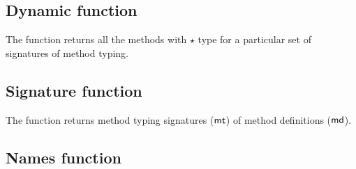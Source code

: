 \documentclass{tex/llncs}
\begin{document}
\begin{mathpar}




\end{mathpar}

\subsection{Dynamic function}

The  function returns all the methods with $\star$ type for a particular set of 
signatures of method typing.

\begin{mathpar}

\end{mathpar}

\subsection{Signature function}

The  function returns method typing signatures ($\mt$) of method definitions ($\md$).

\begin{mathpar}

\end{mathpar}

\subsection{Names function}
\end{document}
